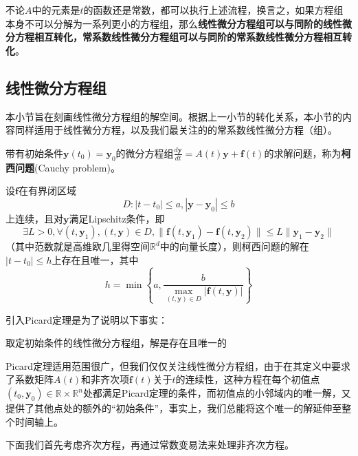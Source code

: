 不论$A$中的元素是$t$的函数还是常数，都可以执行上述流程，换言之，如果方程组本身不可以分解为一系列更小的方程组，那么\textbf{线性微分方程组可以与同阶的线性微分方程相互转化，常系数线性微分方程组可以与同阶的常系数线性微分方程相互转化}。

\subsection{线性微分方程组}\label{sub:solution_of_linear_equation_system}

本小节旨在刻画线性微分方程组的解空间。根据上一小节的转化关系，本小节的内容同样适用于线性微分方程，以及我们最关注的的常系数线性微分方程（组）。

\begin{definition}[柯西问题]
    带有初始条件$\mathbf{y}(t_0)=\mathbf{y}_0$的微分方程组$\frac{d\mathbf{y}}{dt}=A(t)\mathbf{y}+\mathbf{f}(t)$的求解问题，称为\textbf{柯西问题}(Cauchy problem)。
\end{definition}

\begin{claim}[Picard定理]
    设$\mathbf{f}$在有界闭区域
    $$D:|t-t_0|\leq a,|\mathbf{y}-\mathbf{y}_0|\leq b$$
    上连续，且对$\mathbf{y}$满足Lipschitz条件，即
    $$\exists L>0,\forall (t,\mathbf{y}_1),(t,\mathbf{y})\in D,\|\mathbf{f}(t,\mathbf{y}_1)-\mathbf{f}(t,\mathbf{y}_2)\|\leq L\|\mathbf{y}_1-\mathbf{y}_2\|$$
    （其中范数就是高维欧几里得空间$\mathbb{R}^d$中的向量长度），则柯西问题的解在$|t-t_0|\leq h$上存在且唯一，其中
    $$h=\min\left\{a,\frac{b}{\max_{(t,\mathbf{y})\in D}|\mathbf{f}(t,\mathbf{y})|}\right\}$$
\end{claim}

引入Picard定理是为了说明以下事实：
\begin{proposition}
    取定初始条件的线性微分方程组，解是存在且唯一的
\end{proposition}

Picard定理适用范围很广，但我们仅仅关注线性微分方程组，由于在其定义中要求了系数矩阵$A(t)$和非齐次项$\mathbf{f}(t)$关于$t$的连续性，这种方程在每个初值点$(t_0,\mathbf{y}_0)\in\mathbb{R} \times \mathbb{R}^n$处都满足Picard定理的条件，而初值点的小邻域内的唯一解，又提供了其他点处的额外的“初始条件”，事实上，我们总能将这个唯一的解延伸至整个时间轴上。

下面我们首先考虑齐次方程，再通过常数变易法来处理非齐次方程。

